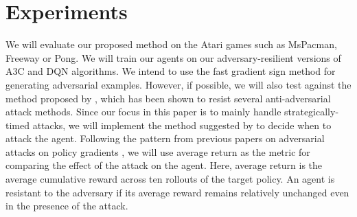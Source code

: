 \section{Experiments}
We will evaluate our proposed method on the Atari games such as MsPacman, Freeway or Pong. We will train our agents on our adversary-resilient versions of A3C and DQN algorithms. We intend to use the fast gradient sign method \cite{seventeen} for generating adversarial examples. However, if possible, we will also test against the method proposed by \cite{eighteen}, which has been shown to resist several anti-adversarial attack methods. Since our focus in this paper is to mainly handle strategically-timed attacks, we will implement the method suggested by \cite{fourteen} to decide when to attack the agent. Following the pattern from previous papers on adversarial attacks on policy gradients \cite{thirteen, fourteen}, we will use average return as the metric for comparing the effect of the attack on the agent. Here, average return is the average cumulative reward across ten rollouts of the target policy. An agent is resistant to the adversary if its average reward remains relatively unchanged even in the presence of the attack. 


